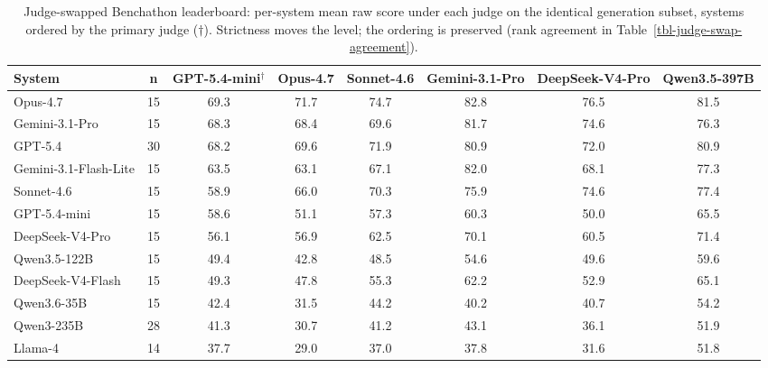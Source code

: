 \begin{table}[t]
\centering\footnotesize
\caption{Judge-swapped Benchathon leaderboard: per-system mean raw score under each judge on the identical generation subset, systems ordered by the primary judge ($\dagger$). Strictness moves the level; the ordering is preserved (rank agreement in Table~\ref{tbl-judge-swap-agreement}).}
\label{tbl-judge-swap}
\setlength{\tabcolsep}{3pt}
\begin{tabular*}{\textwidth}{@{\extracolsep{\fill}}lccccccc@{}}
\toprule
System & n & GPT-5.4-mini$^\dagger$ & Opus-4.7 & Sonnet-4.6 & Gemini-3.1-Pro & DeepSeek-V4-Pro & Qwen3.5-397B \\
\midrule
Opus-4.7 & 15 & 69.3 & 71.7 & 74.7 & 82.8 & 76.5 & 81.5 \\
Gemini-3.1-Pro & 15 & 68.3 & 68.4 & 69.6 & 81.7 & 74.6 & 76.3 \\
GPT-5.4 & 30 & 68.2 & 69.6 & 71.9 & 80.9 & 72.0 & 80.9 \\
Gemini-3.1-Flash-Lite & 15 & 63.5 & 63.1 & 67.1 & 82.0 & 68.1 & 77.3 \\
Sonnet-4.6 & 15 & 58.9 & 66.0 & 70.3 & 75.9 & 74.6 & 77.4 \\
GPT-5.4-mini & 15 & 58.6 & 51.1 & 57.3 & 60.3 & 50.0 & 65.5 \\
DeepSeek-V4-Pro & 15 & 56.1 & 56.9 & 62.5 & 70.1 & 60.5 & 71.4 \\
Qwen3.5-122B & 15 & 49.4 & 42.8 & 48.5 & 54.6 & 49.6 & 59.6 \\
DeepSeek-V4-Flash & 15 & 49.3 & 47.8 & 55.3 & 62.2 & 52.9 & 65.1 \\
Qwen3.6-35B & 15 & 42.4 & 31.5 & 44.2 & 40.2 & 40.7 & 54.2 \\
Qwen3-235B & 28 & 41.3 & 30.7 & 41.2 & 43.1 & 36.1 & 51.9 \\
Llama-4 & 14 & 37.7 & 29.0 & 37.0 & 37.8 & 31.6 & 51.8 \\
\bottomrule
\end{tabular*}
\end{table}

